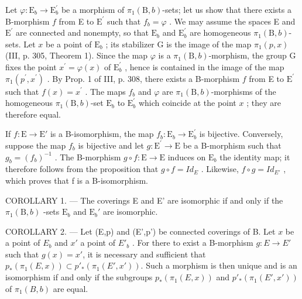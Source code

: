 Let \(\varphi\colon\mathrm{E}_{b}\to\mathrm{E}_{b}^{\prime}\) be a morphism of \(\pi_{1}(\mathrm{B},b)\)-sets; let us show that there exists a B-morphism \(f\) from E to \(\mathrm{E}^{\prime}\) such that \(f_{b}=\varphi\) . We may assume the spaces E and \(\mathrm{E}^{\prime}\) are connected and nonempty, so that \(\mathrm{E}_{b}\) and \(\mathrm{E}_{b}^{\prime}\) are homogeneous \(\pi_{1}(\mathrm{B},b)\)-sets. Let \(x\) be a point of \(\mathrm{E}_{b}\) ; its stabilizer G is the image of the map \(\pi_{1}(p,x)\) (III, p. 305, Theorem 1). Since the map \(\varphi\) is a \(\pi_{1}(\mathrm{B},b)\)-morphism, the group G fixes the point \(x^{\prime}=\varphi(x)\) of \(\mathrm{E}_{b}^{\prime}\) , hence is contained in the image of the map \(\pi_{1}(p^{\prime},x^{\prime})\) . By Prop. 1 of III, p. 308, there exists a B-morphism \(f\) from E to \(\mathrm{E}^{\prime}\) such that \(f(x)=x^{\prime}\) . The maps \(f_{b}\) and \(\varphi\) are \(\pi_{1}(\mathrm{B},b)\)-morphisms of the homogeneous \(\pi_{1}(\mathrm{B},b)\)-set \(\mathrm{E}_{b}\) to \(\mathrm{E}_{b}^{\prime}\) which coincide at the point \(x\) ; they are therefore equal.

If \(f\colon \mathrm{E}\to \mathrm{E}'\) is a B-isomorphism, the map \(f_{b}\colon \mathrm{E}_{b}\to \mathrm{E}_{b}^{\prime}\) is bijective. Conversely, suppose the map \(f_{b}\) is bijective and let \(g\colon \mathrm{E}^{\prime}\to \mathrm{E}\) be a B-morphism such that \(g_{b} = (f_{b})^{-1}\) . The B-morphism \(g\circ f\colon \mathrm{E}\to \mathrm{E}\) induces on \(\mathrm{E}_b\) the identity map; it therefore follows from the proposition that \(g \circ f = Id_{E}\) . Likewise, \(f \circ g = Id_{E'}\) , which proves that f is a B-isomorphism.

COROLLARY 1. --- The coverings E and E' are isomorphic if and only if the \(\pi_1(\mathrm{B},b)\) -sets \(\mathrm{E}_b\) and \(\mathrm{E}_b'\) are isomorphic.

COROLLARY 2. --- Let (E,p) and (E',p') be connected coverings of B. Let \(x\) be a point of \(E_{b}\) and \(x'\) a point of \(E'_{b}\) . For there to exist a B-morphism \(g\colon E\to E'\) such that \(g(x)=x'\), it is necessary and sufficient that \(p_{*}(\pi_{1}(E,x))\subset p'_{*}(\pi_{1}(E',x'))\). Such a morphism is then unique and is an isomorphism if and only if the subgroups \(p_{*}(\pi_{1}(E,x))\) and \(p'_{*}(\pi_{1}(E',x'))\) of \(\pi_{1}(B,b)\) are equal.

